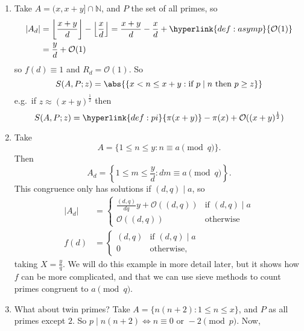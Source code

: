 \documentclass{article}
\newcommand{\1}{\mathbbm{1}}
\newcommand{\bigO}{\mathcal{O}}
\DeclarePairedDelimiter\floor{\lfloor}{\rfloor}
\begin{document}
\begin{eg}\leavevmode
  \begin{enumerate}[label=(\arabic*)]
    \item Take $A = (x, %
      x+y] \cap \mathbb{N}$, and $P$ the set of all primes, so
      \begin{align*}
        |A_d| &= \floor*{\frac{x+y}{d}} - \floor*{\frac{x}{d}} = \frac{x+y}{d} - \frac{x}{d} + \hyperlink{def:asymp}{\bigO(1)} \\
              &= \frac{y}{d} + \bigO(1)
      \end{align*}
      so $f(d) \equiv 1$ and $R_d = \bigO(1)$.
      So
      \begin{equation*}
        S(A,P;z) = \abs{\{x < n \leq x+y : \text{if }p \mid n\text{ then }p \geq z\}}
      \end{equation*}
      e.g.\ if $z \approx (x+y)^{\frac{1}{2}}$ then
      \begin{equation*}
        S(A,P; z) = \hyperlink{def:pi}{\pi(x+y)} - \pi(x) + \bigO((x+y)^{\frac{1}{2}})
      \end{equation*}
    \item Take
      \begin{equation*}A = \{1 \leq n \leq y : n \equiv a \pmod{q}\}.\end{equation*}
      Then
      \begin{equation*}A_d = \left\{1 \leq m \leq \frac{y}{d} : dm \equiv a \pmod{q}\right\}.\end{equation*}
      This congruence only has solutions if $(d,q) \mid a$, so
      \begin{align*}
        |A_d| &=
        \begin{cases}
          \frac{(d,q)}{dq} y + \bigO((d,q)) & \text{if } (d,q) \mid a \\
          \bigO((d,q)) & \text{otherwise}
        \end{cases} \\
        f(d) &=
        \begin{cases}
          (d,q) & \text{if } (d,q) \mid a \\
          0 & \text{otherwise},
        \end{cases}
      \end{align*}
      taking $X = \frac{y}{q}$.
      We will do this example in more detail later, but it shows how $f$ can be more complicated, and that we can use sieve methods to count primes congruent to $a \pmod{q}$.
    \item What about twin primes? Take $A = \{n(n+2) : 1 \leq n \leq x\}$, and $P$ as all primes except $2$. So $p \mid n(n+2) \iff n \equiv 0 \text{ or } -2 \pmod{p}$. Now,

\end{enumerate}
\end{eg}
\end{document}
